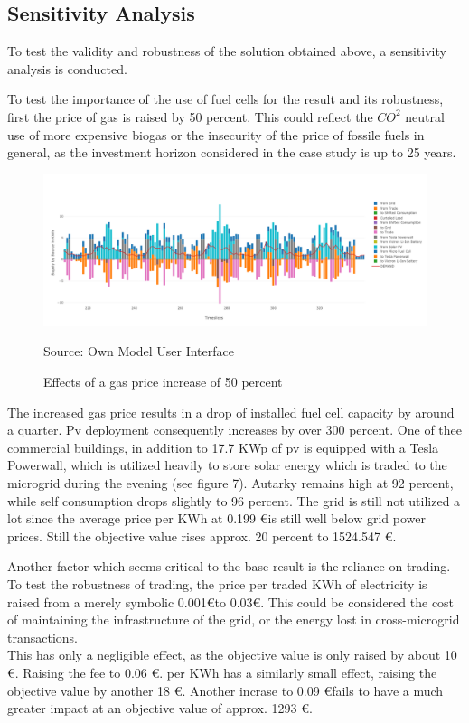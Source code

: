 \documentclass[
	11pt,								%
	DIV10,								%
	a4paper,         					%
	oneside,							%
	headheight=20pt,					%
	footheight=20pt,					%
    parskip=full,						%
    listof=totoc,						%
	bibliography=totoc,					%
	index=totoc,						%
]{scrartcl}
\begin{document}
\subsection{Sensitivity Analysis}
To test the validity and robustness of the solution obtained above, a sensitivity analysis is conducted. 

To test the importance of the use of fuel cells for the result and its robustness, first the price of gas is raised by 50 percent. This could reflect the $CO^2$ neutral use of more expensive biogas or the insecurity of the price of fossile fuels in general, as the investment horizon considered in the case study is up to 25 years.
\begin{figure}[H]
	\centering
	\includegraphics[width=1\textwidth]{pictures/SCEN_1.png}
	\caption{Effects of a gas price increase of 50 percent}
	\label{commercial_dispatch_base}
	\flushleft\quad\quad\footnotesize{Source: Own Model User Interface}
\end{figure}	

The increased gas price results in a drop of installed fuel cell capacity by around a quarter. Pv deployment consequently increases by over 300 percent. One of thee commercial buildings, in addition to 17.7 KWp of pv is equipped with a Tesla Powerwall, which is utilized heavily to store solar energy which is traded to the microgrid during the evening (see figure 7). Autarky remains high at 92 percent, while self consumption drops slightly to 96 percent. The grid is still not utilized a lot since the average price per KWh at 0.199 \euro is still well below grid power prices. Still the objective value rises approx. 20 percent to 1524.547 \euro.

Another factor which seems critical to the base result is the reliance on trading. To test the robustness of trading, the price per traded KWh of electricity is raised from a merely symbolic 0.001\euro to 0.03\euro. This could be considered the cost of maintaining the infrastructure of the grid, or the energy lost in cross-microgrid transactions.
\\
This has only a negligible effect, as the objective value is only raised by about 10 \euro. Raising the fee to 0.06 \euro. per KWh has a similarly small effect, raising the objective value by another 18 \euro. Another incrase to 0.09 \euro fails to have a much greater impact at an objective value of approx. 1293 \euro. 
\end{document}
